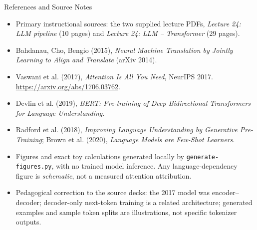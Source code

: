 \documentclass[aspectratio=169,10pt]{beamer}
\begin{document}
\begin{frame}{References and Source Notes}
\scriptsize
\begin{itemize}
\item Primary instructional sources: the two supplied lecture PDFs, \emph{Lecture 24: LLM pipeline} (10 pages) and \emph{Lecture 24: LLM -- Transformer} (29 pages).
\item Bahdanau, Cho, Bengio (2015), \emph{Neural Machine Translation by Jointly Learning to Align and Translate} (arXiv 2014).
\item Vaswani et al. (2017), \emph{Attention Is All You Need}, NeurIPS 2017. \url{https://arxiv.org/abs/1706.03762}.
\item Devlin et al. (2019), \emph{BERT: Pre-training of Deep Bidirectional Transformers for Language Understanding}.
\item Radford et al. (2018), \emph{Improving Language Understanding by Generative Pre-Training}; Brown et al. (2020), \emph{Language Models are Few-Shot Learners}.
\item Figures and exact toy calculations generated locally by \texttt{generate-figures.py}, with no trained model inference. Any language-dependency figure is \emph{schematic}, not a measured attention attribution.
\item Pedagogical correction to the source decks: the 2017 model was encoder--decoder; decoder-only next-token training is a related architecture; generated examples and sample token splits are illustrations, not specific tokenizer outputs.
\end{itemize}
\end{frame}
\end{document}
